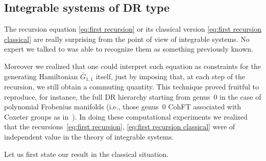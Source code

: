 \documentclass[pdftex]{sigma}
\numberwithin{equation}{section}
\newcommand{\<}{\left<}
\renewcommand{\>}{\right>}
\newcommand{\oG}{{\overline G}}
\begin{document}
\subsection{Integrable systems of DR type}\label{section:DRtype} The recursion equation \eqref{eq:first recursion} or its classical version \eqref{eq:first recursion classical} are really surprising from the point of view of integrable systems. No expert we talked to was able to recognize them as something previously known.

Moreover we realized that one could interpret such equation as constraints for the generating Hamiltonian $\oG_{1,1}$ itself, just by imposing that, at each step of the recursion, we still obtain a commuting quantity. This technique proved fruitful to reproduce, for instance, the full DR hierarchy starting from genus~$0$ in the case of polynomial Frobenius manifolds (i.e., those genus~$0$ CohFT associated with Coxeter groups as in~\cite{Dub93}). In doing these computational experiments we realized that the recursions~\eqref{eq:first recursion}, \eqref{eq:first recursion classical} were of independent value in the theory of integrable systems.

Let us f\/irst state our result in the classical situation.
\end{document}
